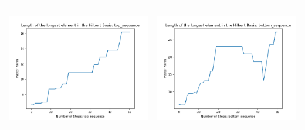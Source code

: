 \documentclass[10pt]{article}
\begin{document}
\begin{tabular}{c|c}
\begin{minipage}{.45\textwidth}
\end{minipage} \\ \\
\hline \\
\begin{minipage}{.45\textwidth}
\includegraphics[width=\textwidth]{"DATA/5d/6 generators 2 bound I alternating/top_sequence LENGTH"}
\end{minipage} &
\begin{minipage}{.45\textwidth}
\includegraphics[width=\textwidth]{"DATA/5d/6 generators 2 bound I alternating/bottom_sequence LENGTH"}
\end{minipage}
\end{tabular}
\end{document}
